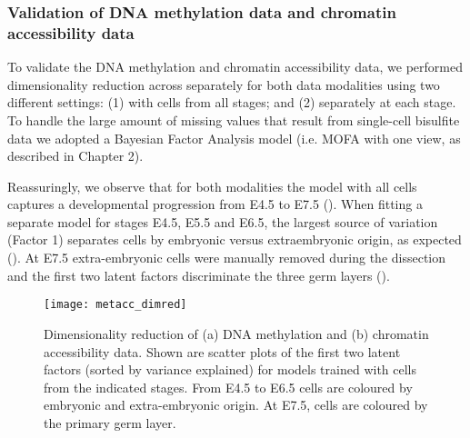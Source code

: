 \subsubsection{Validation of DNA methylation data and chromatin accessibility data}

To validate the DNA methylation and chromatin accessibility data, we performed dimensionality reduction across separately for both data modalities using two different settings: (1) with cells from all stages; and (2) separately at each stage. To handle the large amount of missing values that result from single-cell bisulfite data we adopted a Bayesian Factor Analysis model (i.e. MOFA with one view, as described in Chapter 2). 


Reassuringly, we observe that for both modalities the model with all cells captures a developmental progression from E4.5 to E7.5 (). When fitting a separate model for stages E4.5, E5.5 and E6.5, the largest source of variation (Factor 1) separates cells by embryonic versus extraembryonic origin, as expected (). At E7.5 extra-embryonic cells were manually removed during the dissection and the first two latent factors discriminate the three germ layers ().

\begin{figure}[H]
	\centering
	\texttt{[image: metacc\_dimred]}
	\caption[]{
 	Dimensionality reduction of (a) DNA methylation and (b) chromatin accessibility data. Shown are scatter plots of the first two latent factors (sorted by variance explained) for models trained with cells from the indicated stages. From E4.5 to E6.5 cells are coloured by embryonic and extra-embryonic origin. At E7.5, cells are coloured by the primary germ layer. 
	}
	\label{fig:metacc_dimred}
\end{figure}



